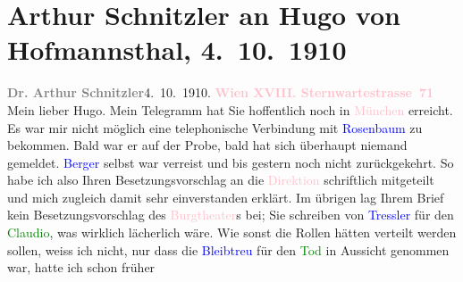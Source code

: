 

               \section[Arthur Schnitzler an Hugo von Hofmannsthal, 4. 10. 1910]{ Arthur Schnitzler an Hugo von Hofmannsthal, 4. 10. 1910}\nopagebreak{}\rehead{ }\normalsize\beginnumbering{} \toendnotes[C]{\smallbreak\pagebreak[2]} 
\toendnotes[C]{\smallbreak}\pstart
           {\pb}\textcolor{gray}{\textbf{Dr. Arthur Schnitzler}}\hfill 4. 10. 1910.\pend
           \pstart
           \textcolor{gray}{\textbf{\textcolor{pink}{Wien XVIII. Sternwartestrasse 71}{}\ledrightnote{\textcolor{pink}{Sternwartestraße}}}}\pend
           \pstart\center{}Mein lieber Hugo.\pend\pstart
           Mein Telegramm hat Sie hoffentlich noch in \textcolor{pink}{München}{}\ledrightnote{\textcolor{pink}{München}} erreicht. Es war mir nicht möglich eine telephonische
                    Verbindung mit \textcolor{blue}{Rosenbaum}{}\ledrightnote{\textcolor{blue}{Richard Rosenbaum}} zu bekommen. Bald
                    war er auf der Probe, bald hat sich überhaupt niemand gemeldet. \textcolor{blue}{Berger}{}\ledrightnote{\textcolor{blue}{Alfred von Berger}} selbst war verreist und bis gestern noch nicht
                    zurückgekehrt. So habe ich also Ihren Besetzungsvorschlag an die \textcolor{pink}{Direktion}{} schriftlich
                    mitgeteilt und mich zugleich damit sehr einverstanden erklärt. Im übrigen lag
                    Ihrem Brief kein Besetzungsvorschlag des \textcolor{pink}{Burgtheater}{}\ledrightnote{\textcolor{pink}{Burgtheater}}s bei; Sie schreiben von \textcolor{blue}{Tressler}{}\ledrightnote{\textcolor{blue}{Otto Tressler}} für den \textcolor{green}{Claudio}{}, was wirklich lächerlich wäre. Wie sonst die Rollen hätten
                    verteilt werden sollen, weiss ich nicht, nur dass die \textcolor{blue}{Bleibtreu}{}\ledrightnote{\textcolor{blue}{Hedwig Bleibtreu}} für den \textcolor{green}{Tod}{} in Aussicht genommen war, hatte ich schon früher
